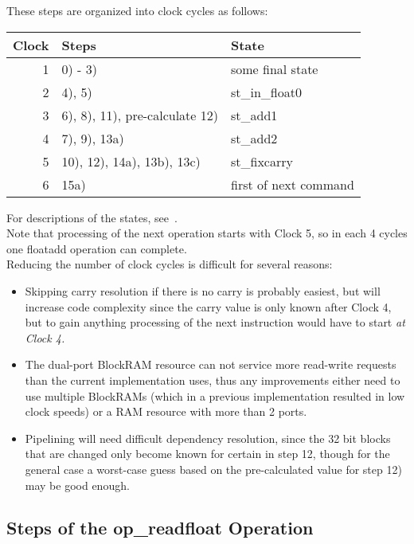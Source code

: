 These steps are organized into clock cycles as follows:\\
\renewcommand\tabline[3]{#1 & #2 & #3\\}
\begin{center}
\begin{tabular}{|r|l|l|}
\hline
\tabline {Clock} {Steps}                          {State}
\hline
\tabline {1}     {0) - 3)}                        {some final state}
\tabline {2}     {4), 5)}                         {st\_in\_float0}
\tabline {3}     {6), 8), 11), pre-calculate 12)} {st\_add1}
\tabline {4}     {7), 9), 13a)}                   {st\_add2}
\tabline {5}     {10), 12), 14a), 13b), 13c)}     {st\_fixcarry}
\tabline {6}     {15a)}                           {first of next command}
\hline
\end{tabular}
\end{center}
For descriptions of the states, see~.\\

Note that processing of the next operation starts with Clock 5, so in
each 4 cycles one floatadd operation can complete.\\
Reducing the number of clock cycles is difficult for several reasons:\\
\begin{itemize}
\item Skipping carry resolution if there is no carry is probably easiest, but
      will increase code complexity since the carry value is only known after
      Clock 4, but to gain anything processing of the next instruction would
      have to start \em at \rm Clock 4.
\item The dual-port BlockRAM resource can not service more read-write requests
      than the current implementation uses, thus any improvements either need
      to use multiple BlockRAMs (which in a previous implementation resulted in
      low clock speeds) or a RAM resource with more than 2 ports.
\item Pipelining will need difficult dependency resolution, since the 32 bit blocks
      that are changed only become known for certain in step 12, though for the
      general case a worst-case guess based on the pre-calculated value for step
      12) may be good enough.
\end{itemize}

\subsection{Steps of the op\_readfloat Operation}

